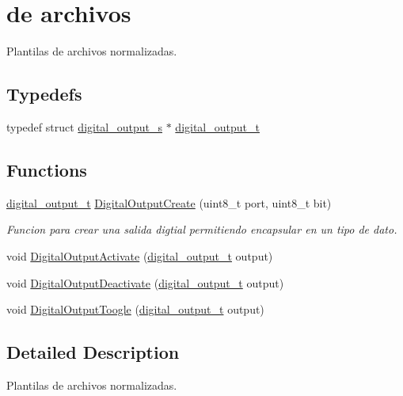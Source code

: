 \hypertarget{group___plantilla}{}\section{de archivos}
\label{group___plantilla}


Plantilas de archivos normalizadas.  


\subsection*{Typedefs}
\begin{DoxyCompactItemize}
\item 
typedef struct \hyperlink{structdigital__output__s}{digital\+\_\+output\+\_\+s} $\ast$ \hyperlink{group___plantilla_ga3e63b19d3d0dbfbfb2c50b3ac1f69aa0}{digital\+\_\+output\+\_\+t}
\end{DoxyCompactItemize}
\subsection*{Functions}
\begin{DoxyCompactItemize}
\item 
\hyperlink{group___plantilla_ga3e63b19d3d0dbfbfb2c50b3ac1f69aa0}{digital\+\_\+output\+\_\+t} \hyperlink{group___plantilla_ga99386f34f6a3040267ecb98215761571}{Digital\+Output\+Create} (uint8\+\_\+t port, uint8\+\_\+t bit)
\begin{DoxyCompactList}\small\item\em Funcion para crear una salida digtial permitiendo encapsular en un tipo de dato. \end{DoxyCompactList}\item 
void \hyperlink{group___plantilla_ga1f511c067eceef7bc5ccddfda3255b9b}{Digital\+Output\+Activate} (\hyperlink{group___plantilla_ga3e63b19d3d0dbfbfb2c50b3ac1f69aa0}{digital\+\_\+output\+\_\+t} output)
\item 
void \hyperlink{group___plantilla_ga0d953039d5fb5d7166f961689475161e}{Digital\+Output\+Deactivate} (\hyperlink{group___plantilla_ga3e63b19d3d0dbfbfb2c50b3ac1f69aa0}{digital\+\_\+output\+\_\+t} output)
\item 
void \hyperlink{group___plantilla_ga7f1a1e6f816d67f9090602e3257be6a6}{Digital\+Output\+Toogle} (\hyperlink{group___plantilla_ga3e63b19d3d0dbfbfb2c50b3ac1f69aa0}{digital\+\_\+output\+\_\+t} output)
\end{DoxyCompactItemize}


\subsection{Detailed Description}
Plantilas de archivos normalizadas. 



